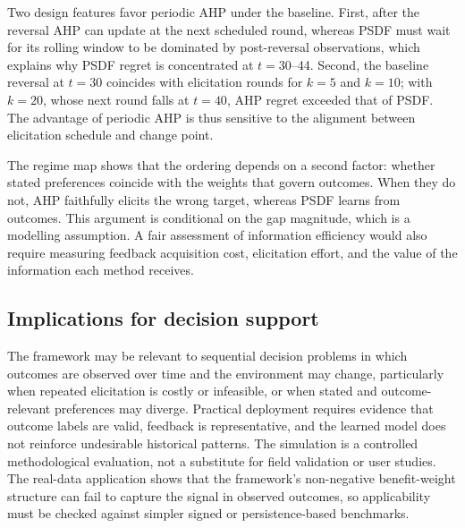 \documentclass[12pt,a4paper]{article}
\begin{document}
Two design features favor periodic AHP under the baseline. First, after the reversal AHP can update at the next scheduled round, whereas PSDF must wait for its rolling window to be dominated by post-reversal observations, which explains why PSDF regret is concentrated at $t=30$--44. Second, the baseline reversal at $t=30$ coincides with elicitation rounds for $k=5$ and $k=10$; with $k=20$, whose next round falls at $t=40$, AHP regret exceeded that of PSDF. The advantage of periodic AHP is thus sensitive to the alignment between elicitation schedule and change point.

The regime map shows that the ordering depends on a second factor: whether stated preferences coincide with the weights that govern outcomes. When they do not, AHP faithfully elicits the wrong target, whereas PSDF learns from outcomes. This argument is conditional on the gap magnitude, which is a modelling assumption. A fair assessment of information efficiency would also require measuring feedback acquisition cost, elicitation effort, and the value of the information each method receives.

\subsection{Implications for decision support}
The framework may be relevant to sequential decision problems in which outcomes are observed over time and the environment may change, particularly when repeated elicitation is costly or infeasible, or when stated and outcome-relevant preferences may diverge. Practical deployment requires evidence that outcome labels are valid, feedback is representative, and the learned model does not reinforce undesirable historical patterns. The simulation is a controlled methodological evaluation, not a substitute for field validation or user studies. The real-data application shows that the framework's non-negative benefit-weight structure can fail to capture the signal in observed outcomes, so applicability must be checked against simpler signed or persistence-based benchmarks.
\end{document}
